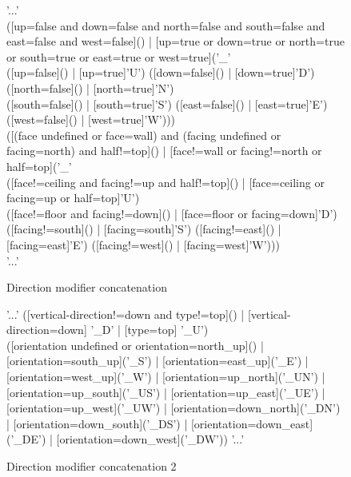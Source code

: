 \begin{subfigures}
	\begin{figure}
		\begin{rail}
			'...' \\
			([up=false and down=false and north=false and south=false and east=false and west=false]() | [up=true or down=true or north=true or south=true or east=true or west=true]('\_' \\ ([up=false]() | [up=true]'U') ([down=false]() | [down=true]'D') ([north=false]() | [north=true]'N') \\ ([south=false]() | [south=true]'S') ([east=false]() | [east=true]'E') ([west=false]() | [west=true]'W'))) \\
			([(face undefined or face=wall) and (facing undefined or facing=north) and half!=top]() | [face!=wall or facing!=north or half=top]('\_' \\
			([face!=ceiling and facing!=up and half!=top]() | [face=ceiling or facing=up or half=top]'U') \\ ([face!=floor and facing!=down]() | [face=floor or facing=down]'D') \\ ([facing!=south]() | [facing=south]'S') ([facing!=east]() | [facing=east]'E') ([facing!=west]() | [facing=west]'W'))) \\
			'...'
		\end{rail}
		\caption{Direction modifier concatenation}
	\end{figure}

	\begin{figure}
		\begin{rail}
			'...' ([vertical-direction!=down and type!=top]() | [vertical-direction=down] '\_D' | [type=top] '\_U') \\
			([orientation undefined or orientation=north\_up]() | [orientation=south\_up]('\_S') | [orientation=east\_up]('\_E') | [orientation=west\_up]('\_W') | [orientation=up\_north]('\_UN') | [orientation=up\_south]('\_US') | [orientation=up\_east]('\_UE') | [orientation=up\_west]('\_UW') | [orientation=down\_north]('\_DN') | [orientation=down\_south]('\_DS') | [orientation=down\_east]('\_DE') | [orientation=down\_west]('\_DW')) '...'
		\end{rail}
		\caption{Direction modifier concatenation 2}
	\end{figure}
	

\end{subfigures}
